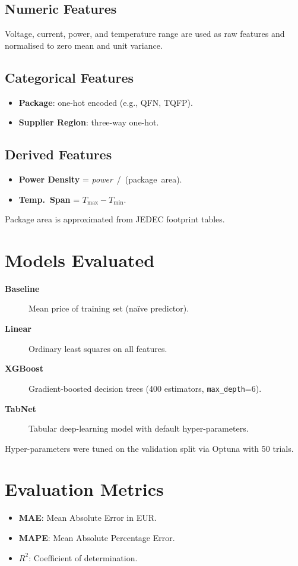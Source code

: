 \subsection{Numeric Features}
Voltage, current, power, and temperature range are used as raw features and normalised to zero mean and unit variance.

\subsection{Categorical Features}
\begin{itemize}
  \item \textbf{Package}: one-hot encoded (e.g., QFN, TQFP).
  \item \textbf{Supplier Region}: three-way one-hot.
\end{itemize}

\subsection{Derived Features}
\begin{itemize}
  \item \textbf{Power Density} = \textit{power}~\slash~(package~area).
  \item \textbf{Temp.~Span}   = $T_{\max}-T_{\min}$.
\end{itemize}
Package area is approximated from JEDEC footprint tables.

\section{Models Evaluated}
\begin{description}
  \item[\textbf{Baseline}] Mean price of training set (naïve predictor).
  \item[\textbf{Linear}] Ordinary least squares on all features.
  \item[\textbf{XGBoost}] Gradient-boosted decision trees (400 estimators, \texttt{max\_depth}=6).
  \item[\textbf{TabNet}] Tabular deep-learning model with default hyper-parameters.
\end{description}
Hyper-parameters were tuned on the validation split via Optuna with 50 trials.

\section{Evaluation Metrics}
\begin{itemize}
  \item \textbf{MAE}: Mean Absolute Error in EUR.
  \item \textbf{MAPE}: Mean Absolute Percentage Error.
  \item \textbf{$R^{2}$}: Coefficient of determination.
\end{itemize}

